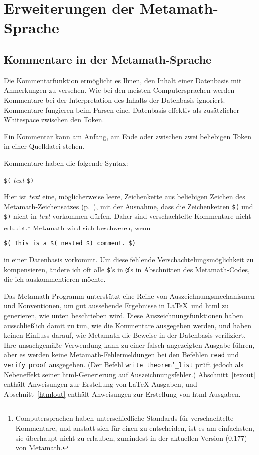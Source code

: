 \section{Erweiterungen der Metamath-Sprache}

\subsection{Kommentare in der Metamath-Sprache}\label{comments}

Die Kommentarfunktion ermöglicht es Ihnen, den Inhalt einer Datenbasis mit Anmerkungen zu versehen.  Wie bei den meisten Computersprachen werden Kommentare bei der Interpretation des Inhalts der Datenbasis ignoriert. Kommentare fungieren beim Parsen einer Datenbasis effektiv als zusätzlicher Whitespace zwischen den Token.

Ein Kommentar kann am Anfang, am Ende oder zwischen zwei beliebigen Token in einer Quelldatei stehen.

Kommentare haben die folgende Syntax:
\begin{center}
 \texttt{\$(} {\em text} \texttt{\$)}
\end{center}
Hier ist  {\em text} eine, möglicherweise leere, Zeichenkette aus beliebigen Zeichen des Metamath-Zeichensatzes (p.~\pageref{spec1chars}), mit der Ausnahme, dass die Zeichenketten \texttt{\$(} und \texttt{\$)} nicht in {\em text} vorkommen dürfen.  Daher sind verschachtelte Kommentare nicht erlaubt:\footnote{Computersprachen haben unterschiedliche Standards für verschachtelte Kommentare, und anstatt sich für einen zu entscheiden, ist es am einfachsten, sie überhaupt nicht zu erlauben, zumindest in der aktuellen Version (0.177) von Metamath.} Metamath wird sich beschweren, wenn
\begin{center}
  \texttt{\$( This is a \$( nested \$) comment.\ \$)}
 \end{center} 
 in einer Datenbasis vorkommt. Um diese fehlende Verschachtelungsmöglichkeit zu kompensieren, ändere ich oft alle \texttt{\$}'s in \texttt{@}'s in Abschnitten des Metamath-Codes, die ich auskommentieren möchte.

Das Metamath-Programm unterstützt eine Reihe von Auszeichnungsmechanismen und Konventionen, um gut aussehende Ergebnisse in \LaTeX\ und {\sc html} zu generieren, wie unten beschrieben wird. Diese Auszeichnungsfunktionen haben ausschließlich damit zu tun, wie die Kommentare ausgegeben werden, und haben keinen Einfluss darauf, wie Metamath die Beweise in der Datenbasis verifiziert. Ihre unsachgemäße Verwendung kann zu einer falsch angezeigten Ausgabe führen, aber es werden keine Metamath-Fehlermeldungen bei den Befehlen \texttt{read} und \texttt{verify proof} ausgegeben.  (Der Befehl \texttt{write theorem\texttt{\char`\_}list} prüft jedoch als Nebeneffekt seiner {\sc html}-Generierung auf Auszeichnungsfehler.) Abschnitt~\ref{texout} enthält Anweisungen zur Erstellung von \LaTeX-Ausgaben, und Abschnitt~\ref{htmlout} enthält Anweisungen zur Erstellung von {\sc html}-Ausgaben.

